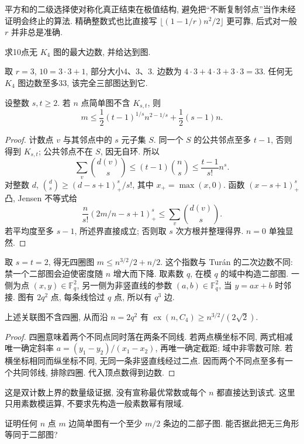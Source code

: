平方和的二级选择使对称化真正结束在极值结构, 避免把“不断复制邻点”当作未经证明会终止的算法. 精确整数式也比直接写 $\lfloor(1-1/r)n^2/2\rfloor$ 更可靠, 后式对一般 $r$ 并非总是准确.
\begin{example}
求10点无 $K_4$ 图的最大边数, 并给达到图.
\end{example}
\begin{solution}
取 $r=3$, $10=3\cdot3+1$, 部分大小4、3、3. 边数为 $4\cdot3+4\cdot3+3\cdot3=33$. 任何无 $K_4$ 图边数至多33, 该完全三部图达到它.
\end{solution}
\begin{theorem}\label{thm:kst}
设整数 $s,t\ge2$. 若 $n$ 点简单图不含 $K_{s,t}$, 则
\[
m\le\frac12(t-1)^{1/s}n^{2-1/s}+\frac12(s-1)n.
\]
\end{theorem}
\begin{proof}
计数点 $v$ 与其邻点中的 $s$ 元子集 $S$. 同一个 $S$ 的公共邻点至多 $t-1$, 否则得到 $K_{s,t}$; 公共邻点不在 $S$, 因无自环. 所以
\[
\sum_v\binom{d(v)}s\le(t-1)\binom ns\le\frac{t-1}{s!}n^s.
\]
对整数 $d$, $\binom ds\ge(d-s+1)_+^s/s!$, 其中 $x_+=\max(x,0)$. 函数 $(x-s+1)_+^s$ 凸, Jensen 不等式给
\[
\frac n{s!}(2m/n-s+1)_+^s\le\sum_v\binom{d(v)}s.
\]
若平均度至多 $s-1$, 所述界直接成立; 否则取 $s$ 次方根并整理得界. $n=0$ 单独显然.
\end{proof}
取 $s=t=2$, 得无四圈图 $m\le n^{3/2}/2+n/2$. 这个指数与 Turán 的二次边数不同: 禁一个二部图会迫使密度随 $n$ 增大而下降.
取素数 $q$, 在模 $q$ 的域中构造二部图. 一侧为点 $(x,y)\in\mathbb F_q^2$, 另一侧为非竖直线的参数 $(a,b)\in\mathbb F_q^2$, 当 $y=ax+b$ 时邻接. 图有 $2q^2$ 点, 每条线恰过 $q$ 点, 所以有 $q^3$ 边.
\begin{proposition}\label{prop:finitefield}
上述关联图不含四圈, 从而沿 $n=2q^2$ 有 $\operatorname{ex}(n,C_4)\ge n^{3/2}/(2\sqrt2)$.
\end{proposition}
\begin{proof}
四圈意味着两个不同点同时落在两条不同线. 若两点横坐标不同, 两式相减唯一确定斜率 $a=(y_1-y_2)/(x_1-x_2)$, 再唯一确定截距; 域中非零数可除. 若横坐标相同而纵坐标不同, 无同一条非竖直线经过二点. 因而两个不同点至多有一个共同邻线, 排除四圈. 代入顶点数得到边数.
\end{proof}
这是双计数上界的数量级证据, 没有宣称最优常数或每个 $n$ 都直接达到该式. 这里只用素数模运算, 不要求先构造一般素数幂有限域.
\begin{exercise}\label{ex:ext1}
证明任何 $n$ 点 $m$ 边简单图有一个至少 $m/2$ 条边的二部子图. 能否据此把无三角形等同于二部图?
\end{exercise}
